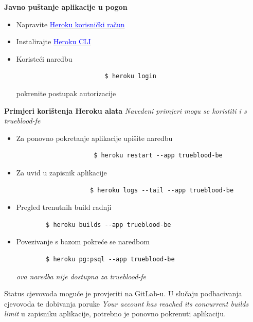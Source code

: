 			\textbf{Javno puštanje aplikacije u pogon}
    			\begin{itemize}
    			    \item Napravite \href{https://signup.heroku.com/}{\textcolor{blue}{Heroku korisnički račun}}
    			    \item Instalirajte \href{https://devcenter.heroku.com/articles/heroku-cli}{\textcolor{blue}{Heroku CLI}}
    			    \item Koristeći naredbu 
    			    \begin{verbatim}
    			        $ heroku login
    			    \end{verbatim}
    			    pokrenite postupak autorizacije
			    \end{itemize}
    			 \textbf{Primjeri korištenja Heroku alata} \newline
    			 \textit{Navedeni primjeri mogu se koristiti i s trueblood-fe}
    			 \begin{itemize}
    			 \item Za ponovno pokretanje aplikacije upišite naredbu
    			 \begin{verbatim}
    			     $ heroku restart --app trueblood-be
    			 \end{verbatim}
    			 \item Za uvid u zapisnik aplikacije
    			 \begin{verbatim}
    			    $ heroku logs --tail --app trueblood-be
    			 \end{verbatim}

                \item Pregled trenutnih build radnji
                \begin{verbatim}
        $ heroku builds --app trueblood-be
                \end{verbatim}
                
                \item Povezivanje s bazom pokreće se naredbom
                \begin{verbatim}
        $ heroku pg:psql --app trueblood-be
                \end{verbatim}
                \textit{ova naredba nije dostupna za trueblood-fe}
    			\end{itemize}
    		Status cjevovoda moguće je provjeriti na GitLab-u. U slučaju podbacivanja cjevovoda te dobivanja poruke \textit{Your account has reached its concurrent builds limit} u zapisniku aplikacije, potrebno je ponovno pokrenuti aplikaciju.
			\eject 